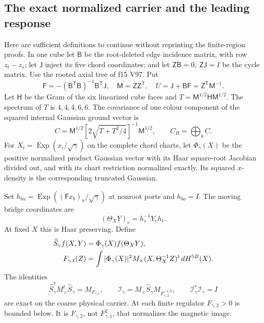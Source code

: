 \documentclass[11pt,oneside]{article}
\begin{document}
\subsection{The exact normalized carrier and the leading response}

Here are sufficient definitions to continue without reprinting the
finite-region proofs. In one cube let \(\mathsf B\) be the
root-deleted edge incidence matrix, with row \(z_t-z_s\);
let \(\mathsf J\) inject its five chord coordinates; and let
\(\mathsf Z\mathsf B=0,\ \mathsf Z\mathsf J=I\) be the cycle matrix.
Use the rooted axial tree of f15 V97. Put
\[
 \mathsf F=-(\mathsf B^{\mathsf T}\mathsf B)^{-1}
                     \mathsf B^{\mathsf T}\mathsf J,\quad
 \mathsf M=\mathsf Z\mathsf Z^{\mathsf T},\quad
 U=\mathsf J+\mathsf B\mathsf F=\mathsf Z^{\mathsf T}\mathsf M^{-1}.
\]
Let \(\mathsf H\) be the Gram of the six linearized cube faces and
\(T=\mathsf M^{1/2}\mathsf H\mathsf M^{1/2}\).
The spectrum of \(T\) is \(4,4,4,6,6\).
The covariance of one colour component of the squared internal
Gaussian ground vector is
\begin{equation}
 C=\mathsf M^{1/2}[2\sqrt{T+T^2/4}]^{-1}\mathsf M^{1/2},
 \qquad C_B=\bigoplus_b C.
 \label{f16v1:covariance}
\end{equation}
For \(X_i=\operatorname{Exp}(x_i/\sqrt\gamma)\) on the complete
chord charts, let \(\Phi_\gamma(X)\) be the positive normalized
product Gaussian vector with its Haar square-root Jacobian divided
out, and with its chart restriction normalized exactly. Its
squared \(x\)-density is the corresponding truncated Gaussian.

Set \(h_{bu}=\operatorname{Exp}((\mathsf F x_b)_u/\sqrt\gamma)\)
at nonroot ports and \(h_{bo}=I\). The moving bridge coordinates are
\[
                    (\Theta_XY)_e=h_s^{-1}Y_eh_t.
\]
At fixed \(X\) this is Haar preserving. Define
\begin{align}
 \widehat S_\gamma f(X,Y)
       &=\Phi_\gamma(X)f(\Theta_XY),\notag\\
 F_{\gamma,t}(Z)
       &=\int|\Phi_\gamma(X)|^2
              M_\times(X,\Theta_X^{-1}Z)^t\,dH^{5B}(X).
 \label{f16v1:gram}
\end{align}
The identities
\[
 \widehat S_\gamma^*M_\times^t\widehat S_\gamma=M_{F_{\gamma,t}},
 \qquad
 \mathcal I_\gamma=M_\times\widehat S_\gamma
                                    M_{F_{\gamma,2}^{-1/2}},
 \qquad \mathcal I_\gamma^*\mathcal I_\gamma=I
\]
are exact on the coarse physical carrier. At each finite regulator
\(F_{\gamma,2}>0\) is bounded below. It is \(F_{\gamma,2}\), not
\(F_{\gamma,1}^2\), that normalizes the magnetic image.
\end{document}

